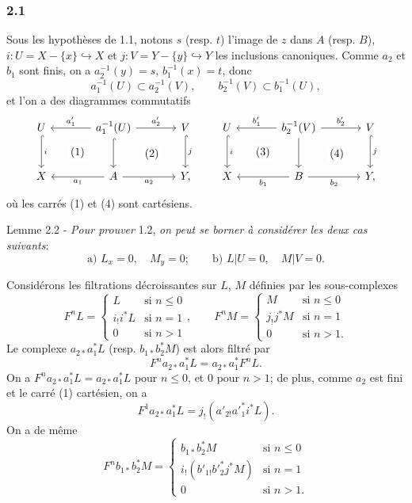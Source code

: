 \subsubsection*{2.1}
Sous les hypothèses de 1.1, notons $s$ (resp. $t$) l'image de $z$ dans $A$ (resp. $B$), $i:U=X-\{x\}\hookrightarrow X$ et $j:V=Y-\{y\}\hookrightarrow Y$ les inclusions canoniques. Comme $a_2$ et $b_1$ sont finis, on a $a_2^{-1}(y)=s$, $b_1^{-1}(x)=t$, donc
\[
a_1^{-1}(U)\subset a_2^{-1}(V),\qquad b_2^{-1}(V)\subset b_1^{-1}(U),
\]
et l'on a des diagrammes commutatifs
\[
\begin{tikzcd}[column sep=large,row sep=large]
U \arrow[d,hook,"i"] \arrow[rd,phantom,"(1)"{description}] & a_1^{-1}(U) \arrow[l,"a'_1"'] \arrow[r,"a'_2"] \arrow[d,hook] \arrow[rd,phantom,"(2)"{description}] & V \arrow[d,hook,"j"]\\
X & A \arrow[l,"a_1"] \arrow[r,"a_2"'] & Y ,
\end{tikzcd}
\qquad
\begin{tikzcd}[column sep=large,row sep=large]
U \arrow[d,hook,"i"] \arrow[rd,phantom,"(3)"{description}] & b_2^{-1}(V) \arrow[l,"b'_1"'] \arrow[r,"b'_2"] \arrow[d] \arrow[rd,phantom,"(4)"{description}] & V \arrow[d,hook,"j"]\\
X & B \arrow[l,"b_1"] \arrow[r,"b_2"'] & Y ,
\end{tikzcd}
\]
où les carrés (1) et (4) sont cartésiens.

\begin{statement}{Lemme 2.2 -}
\emph{Pour prouver} 1.2, \emph{on peut se borner à considérer les deux cas suivants}:
\[
\text{a) } L_x=0,\quad M_y=0;\qquad
\text{b) } L|U=0,\quad M|V=0 .
\]
\end{statement}

Considérons les filtrations décroissantes sur $L$, $M$ définies par les sous-complexes
\[
F^nL=
\begin{cases}
L & \text{si } n\le 0\\
i_!i^*L & \text{si } n=1\\
0 & \text{si } n>1
\end{cases}
,\qquad
F^nM=
\begin{cases}
M & \text{si } n\le 0\\
j_!j^*M & \text{si } n=1\\
0 & \text{si } n>1.
\end{cases}
\]
Le complexe $a_{2*}a_1^*L$ (resp. $b_{1*}b_2^*M$) est alors filtré par
\[
F^n a_{2*}a_1^*L=a_{2*}a_1^*F^nL.
\]
On a $F^n a_{2*}a_1^*L=a_{2*}a_1^*L$ pour $n\le 0$, et $0$ pour $n>1$; de plus, comme $a_2$ est fini et le carré (1) cartésien, on a
\[
F^1a_{2*}a_1^*L=j_!(a'_{2!}a'^*_1i^*L).
\]
On a de même
\[
F^n b_{1*}b_2^*M=
\begin{cases}
b_{1*}b_2^*M & \text{si } n\le 0\\
i_!(b'_{1!}b'^*_2j^*M) & \text{si } n=1\\
0 & \text{si } n>1.
\end{cases}
\]

